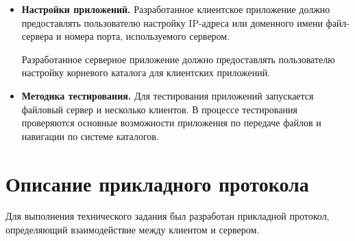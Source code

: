 \begin{itemize}
	\item \textbf{Настройки приложений.} Разработанное клиентское приложение должно предоставлять пользователю настройку IP-адреса или доменного имени файл-сервера и номера порта, используемого сервером.
	
	Разработанное серверное приложение должно предоставлять пользователю настройку корневого каталога для клиентских приложений.

	\item \textbf{Методика тестирования.} Для тестирования приложений запускается файловый сервер и несколько клиентов. В процессе тестирования проверяются основные возможности приложения по передаче файлов и навигации по системе каталогов.

\end{itemize}

\newpage

\section{Описание прикладного протокола}

Для выполнения технического задания был разработан прикладной протокол, определяющий взаимодействие между клиентом и сервером.

